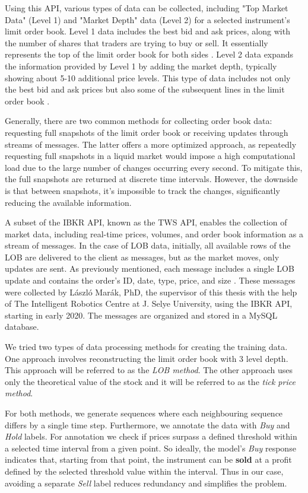 \documentclass[a4paper,oneside,onecolumn,12pt]{book}
\begin{document}
	Using this API, various types of data can be collected, including "Top Market Data" (Level 1) and "Market Depth" data (Level 2) for a selected instrument's limit order book. Level 1 data includes the best bid and ask prices, along with the number of shares that traders are trying to buy or sell. It essentially represents the top of the limit order book for both sides \cite{IL1}. Level 2 data expands the information provided by Level 1 by adding the market depth, typically showing about 5-10 additional price levels. This type of data includes not only the best bid and ask prices but also some of the subsequent lines in the limit order book \cite{IL2}.

	Generally, there are two common methods for collecting order book data: requesting full snapshots of the limit order book or receiving updates through streams of messages. The latter offers a more optimized approach, as repeatedly requesting full snapshots in a liquid market would impose a high computational load due to the large number of changes occurring every second. To mitigate this, the full snapshots are returned at discrete time intervals. However, the downside is that between snapshots, it's impossible to track the changes, significantly reducing the available information. \cite{TLOB}

	A subset of the IBKR API, known as the TWS API, enables the collection of market data, including real-time prices, volumes, and order book information as a stream of messages. In the case of LOB data, initially, all available rows of the LOB are delivered to the client as messages, but as the market moves, only updates are sent. As previously mentioned, each message includes a single LOB update and contains the order's ID, date, type, price, and size \cite{TWSAPIMD}. These messages were collected by László Marák, PhD, the supervisor of this thesis with the help of The Intelligent Robotics Centre at J. Selye University, using the IBKR API, starting in early 2020. The messages are organized and stored in a MySQL database.

	We tried two types of data processing methods for creating the training data. One approach involves reconstructing the limit order book with 3 level depth. This approach will be referred to as the \textit{LOB method}. The other approach uses only the theoretical value of the stock and it will be referred to as the \textit{tick price method}. 
	
	For both methods, we generate sequences where each neighbouring sequence differs by a single time step. Furthermore, we annotate the data with \textit{Buy} and \textit{Hold} labels. For annotation we check if prices surpass a defined threshold within a selected time interval from a given point. So ideally, the model's \textit{Buy} response indicates that, starting from that point, the instrument can be \textbf{sold} at a profit defined by the selected threshold value within the interval. Thus in our case, avoiding a separate \textit{Sell} label reduces redundancy and simplifies the problem.
\end{document}
